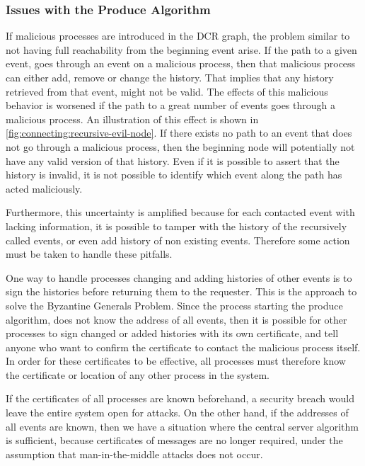 	\subsubsection*{Issues with the Produce Algorithm}
	If malicious processes are introduced in the DCR graph, the problem similar to not having full reachability from the beginning event arise. If the path to a given event, goes through an event on a malicious process, then that malicious process can either add, remove or change the history. That implies that any history retrieved from that event, might not be valid. The effects of this malicious behavior is worsened if the path to a great number of events goes through a malicious process. An illustration of this effect is shown in \autoref{fig:connecting:recursive-evil-node}. If there exists no path to an event that does not go through a malicious process, then the beginning node will potentially not have any valid version of that history. Even if it is possible to assert that the history is invalid, it is not possible to identify which event along the path has acted maliciously.
	
	\newpar Furthermore, this uncertainty is amplified because for each contacted event with lacking information, it is possible to tamper with the history of the recursively called events, or even add history of non existing events. Therefore some action must be taken to handle these pitfalls.
	
	\newpar One way to handle processes changing and adding histories of other events is to sign the histories before returning them to the requester. This is the approach to solve the Byzantine Generals Problem. Since the process starting the produce algorithm, does not know the address of all events, then it is possible for other processes to sign changed or added histories with its own certificate, and tell anyone who want to confirm the certificate to contact the malicious process itself. In order for these certificates to be effective, all processes must therefore know the certificate or location of any other process in the system.
	
	\newpar If the certificates of all processes are known beforehand, a security breach would leave the entire system open for attacks. On the other hand, if the addresses of all events are known, then we have a situation where the central server algorithm is sufficient, because certificates of messages are no longer required, under the assumption that man-in-the-middle attacks does not occur.
	
